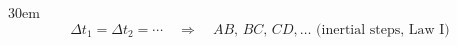 \documentclass[border=4pt]{standalone}
\begin{document}
\begin{varwidth}{30em}
\large
\[ \Delta t_1 = \Delta t_2 = \cdots \quad\Rightarrow\quad AB,\,BC,\,CD,\ldots \text{ (inertial steps, Law I)} \]

\end{varwidth}
\end{document}
